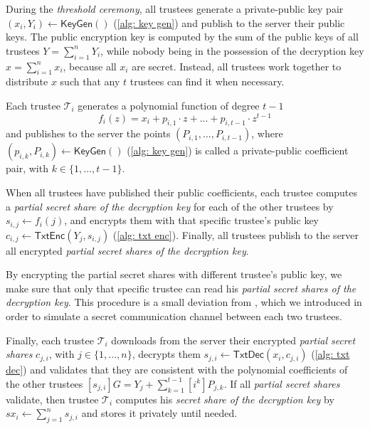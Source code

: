 During the \textit{threshold ceremony}, all trustees generate a private-public key pair $(x_i, Y_i) \gets \mathsf{KeyGen}()$ (\cref{alg: key gen}) and publish to the server their public keys. The public encryption key is computed by the sum of the public keys of all trustees \( Y = \sum_{i=1}^n Y_i \), while nobody being in the possession of the decryption key \( x = \sum_{i=1}^n x_i \), because all $x_i$ are secret. Instead, all trustees work together to distribute $x$ such that any $t$ trustees can find it when necessary. 

Each trustee $\mathcal{T}_i$ generates a polynomial function of degree $t-1$
\[
f_i(z) = x_i + p_{i,1} \cdot z + ... + p_{i,t-1} \cdot z^{t-1}
\]
and publishes to the server the points $(P_{i,1}, ..., P_{i,t-1})$, where $(p_{i, k}, P_{i,k}) \gets \mathsf{KeyGen}()$ (\cref{alg: key gen}) is called a private-public coefficient pair, with $k \in \{1, ..., t-1\}$.

When all trustees have published their public coefficients, each trustee computes a \textit{partial secret share of the decryption key} for each of the other trustees by $s_{i,j} \gets f_i(j)$, and encrypts them with that specific trustee's public key $c_{i,j} \gets \mathsf{TxtEnc}(Y_j, s_{i,j})$ (\cref{alg: txt enc}). Finally, all trustees publish to the server all encrypted \textit{partial secret shares of the decryption key}.

By encrypting the partial secret shares with different trustee's public key, we make sure that only that specific trustee can read his \textit{partial secret shares of the decryption key}. This procedure is a small deviation from \cite{Pedersen91}, which we introduced in order to simulate a secret communication channel between each two trustees.

Finally, each trustee $\mathcal{T}_i$ downloads from the server their encrypted \textit{partial secret shares} $c_{j,i}$, with $j \in \{1, ..., n\}$, decrypts them $s_{j,i} \gets \mathsf{TxtDec}(x_i, c_{j,i})$ (\cref{alg: txt dec}) and validates that they are consistent with the polynomial coefficients of the other trustees $[s_{j,i}]G = Y_j + \sum_{k=1}^{t-1} [i^k] P_{j,k}$. If all \textit{partial secret shares} validate, then trustee $\mathcal{T}_i$ computes his \textit{secret share of the decryption key} by $sx_i \gets \sum_{j=1}^n s_{j,i}$ and stores it privately until needed.

